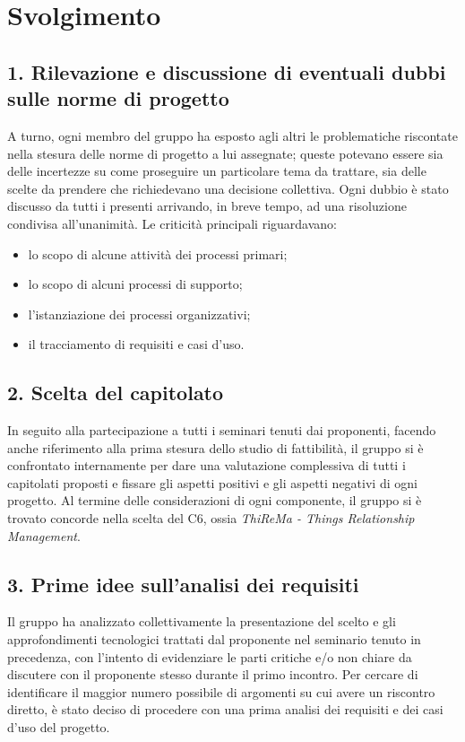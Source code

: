 \newpage
\section*{Svolgimento}

\subsection*{1. Rilevazione e discussione di eventuali dubbi sulle norme di progetto}

A turno, ogni membro del gruppo ha esposto agli altri le problematiche riscontate nella stesura delle norme di progetto a lui assegnate; queste potevano essere sia delle incertezze su come proseguire un particolare tema da trattare, sia delle scelte da prendere che richiedevano una decisione collettiva.
Ogni dubbio è stato discusso da tutti i presenti arrivando, in breve tempo, ad una risoluzione condivisa all'unanimità.
Le criticità principali riguardavano:
\begin{itemize}
	\item lo scopo di alcune attività dei processi primari;
	\item lo scopo di alcuni processi di supporto;
	\item l'istanziazione dei processi organizzativi;
	\item il tracciamento di requisiti e casi d'uso.
\end{itemize}

\subsection*{2. Scelta del capitolato}

In seguito alla partecipazione a tutti i seminari tenuti dai proponenti, facendo anche riferimento alla prima stesura dello studio di fattibilità, il gruppo si è confrontato internamente per dare una valutazione complessiva di tutti i capitolati proposti e fissare gli aspetti positivi e gli aspetti negativi di ogni progetto.
Al termine delle considerazioni di ogni componente, il gruppo si è trovato concorde nella scelta del  C6, ossia \textit{ThiReMa - Things Relationship Management}.

\subsection*{3. Prime idee sull'analisi dei requisiti}

Il gruppo ha analizzato collettivamente la presentazione del  scelto e gli approfondimenti tecnologici trattati dal proponente nel seminario tenuto in precedenza, con l'intento di evidenziare le parti critiche e/o non chiare da discutere con il proponente stesso durante il primo incontro.
Per cercare di identificare il maggior numero possibile di argomenti su cui avere un riscontro diretto, è stato deciso di procedere con una prima analisi dei requisiti e dei casi d'uso del progetto.

